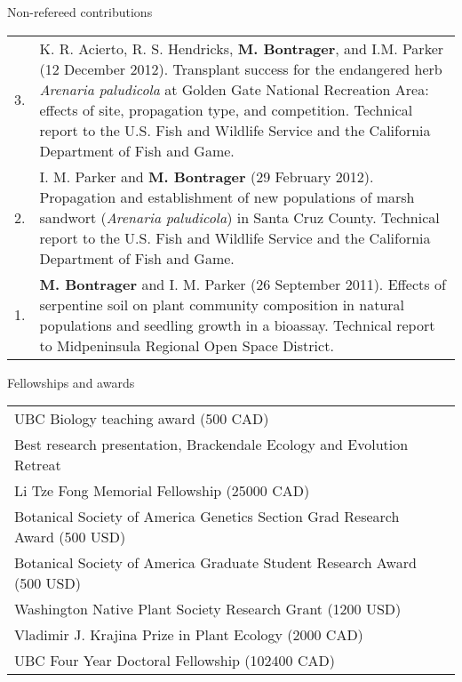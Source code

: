 \documentclass[letterpaper,11pt,oneside]{article}
\begin{document}

\bgroup
\noindent\Large{Non-refereed contributions}  
\normalsize
\bigskip

\def\arraystretch{1.2}
\noindent \begin{tabular}{@{} p{1cm} >{\raggedright\arraybackslash}p{15.11cm}}
3. & K. R. Acierto, R. S. Hendricks, \textbf{M. Bontrager}, and I.M. Parker (12 December 2012). Transplant success for the endangered herb \textit{Arenaria paludicola} at Golden Gate National Recreation Area: effects of site, propagation type, and competition. Technical report to the U.S. Fish and Wildlife Service and the California Department of Fish and Game. \\
2. & I. M. Parker and \textbf{M. Bontrager} (29 February 2012). Propagation and establishment of new populations of marsh sandwort (\textit{Arenaria paludicola}) in Santa Cruz County. Technical report to the U.S. Fish and Wildlife Service and the California Department of Fish and Game. \\
1. & \textbf{M. Bontrager} and I. M. Parker (26 September 2011). Effects of serpentine soil on plant community composition in natural populations and seedling growth in a bioassay. Technical report to Midpeninsula Regional Open Space District. \\
\end{tabular}
\egroup
\bigskip
\bigskip





\bgroup
\noindent\Large{Fellowships and awards}
\bigskip

\normalsize
\noindent \begin{tabular}{@{} >{\raggedright\arraybackslash}p{14.91cm} >{\raggedleft\arraybackslash}p{1.2cm}}
UBC Biology teaching award (500 CAD) & 2018 \\
Best research presentation, Brackendale Ecology and Evolution Retreat & 2016 \\
Li Tze Fong Memorial Fellowship (25000 CAD) & 2016 \\
Botanical Society of America Genetics Section Grad Research Award (500 USD) & 2016 \\
Botanical Society of America Graduate Student Research Award (500 USD) & 2016 \\
Washington Native Plant Society Research Grant (1200 USD) & 2016 \\
Vladimir J. Krajina Prize in Plant Ecology (2000 CAD) & 2013 \\
UBC Four Year Doctoral Fellowship (102400 CAD) & 2012 \\
\end{tabular}
\egroup
\bigskip
\bigskip
 
\end{document}
